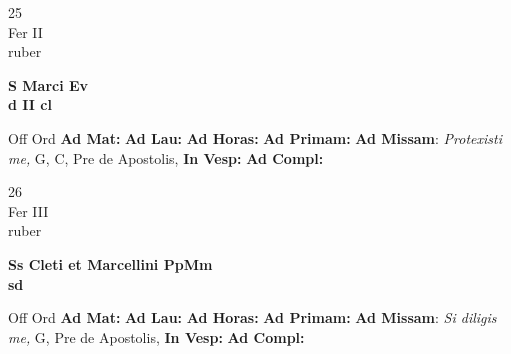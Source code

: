 \documentclass[10pt, openany]{book}
\begin{document}
    \begin{center}
        \begin{minipage}{3.5in}
            \vspace{2em}
            \begin{minipage}{0.5in}
                {\Huge 25} \\
                {\normalsize Fer II} \\
                {\normalsize ruber}
            \end{minipage}
            \begin{minipage}{3.0in}
                \textbf{ \large S Marci Ev \\
                \textnormal{\normalsize d II cl}} \\ 
            \end{minipage}
            \begin{justify}Off Ord
                \textbf{Ad Mat: }
                \textbf{Ad Lau: }
                \textbf{Ad Horas: }
                \textbf{Ad Primam: }\textbf{Ad Missam}: \textit{Protexisti me,} G, C, Pre de Apostolis,  
                \textbf{In Vesp: }
                \textbf{Ad Compl: }
            \end{justify}
        \end{minipage}
    \end{center}

    \begin{center}
        \begin{minipage}{3.5in}
            \vspace{2em}
            \begin{minipage}{0.5in}
                {\Huge 26} \\
                {\normalsize Fer III} \\
                {\normalsize ruber}
            \end{minipage}
            \begin{minipage}{3.0in}
                \textbf{ \large Ss Cleti et Marcellini PpMm \\
                \textnormal{\normalsize sd}} \\ 
            \end{minipage}
            \begin{justify}Off Ord
                \textbf{Ad Mat: }
                \textbf{Ad Lau: }
                \textbf{Ad Horas: }
                \textbf{Ad Primam: }\textbf{Ad Missam}: \textit{Si diligis me,} G, Pre de Apostolis,  
                \textbf{In Vesp: }
                \textbf{Ad Compl: }
            \end{justify}
        \end{minipage}
    \end{center}
\end{document}
